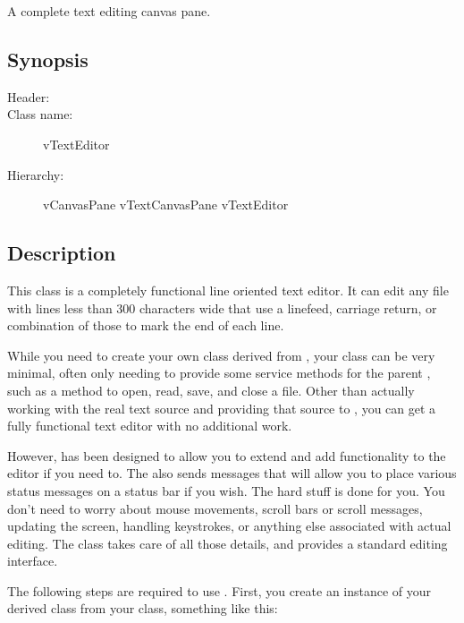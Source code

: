 

A complete text editing canvas pane.

\subsection* {Synopsis}

\begin{description}
	\item [Header:] 
	\item [Class name:] vTextEditor
 	\item [Hierarchy:] vCanvasPane \rta vTextCanvasPane \rta vTextEditor
\end{description}

\subsection* {Description}

This class is a completely functional line oriented text editor.
It can edit any file with lines less than 300 characters wide that
use a linefeed, carriage return, or combination of those to mark
the end of each line.

While you need to create your own class derived from ,
your class can be very minimal, often only needing to provide some
service methods for the parent , such as a method
to open, read, save, and close a file. Other than actually working
with the real text source and providing that source to ,
you can get a fully functional text editor with no additional work.

However,  has been designed to allow you to extend
and add functionality to the editor if you need to. The 
also sends messages that will allow you to place various status
messages on a status bar if you wish. The hard stuff is done for you.
You don't need to worry about mouse movements, scroll bars or scroll
messages, updating the screen, handling keystrokes, or anything else
associated with actual editing. The  class takes
care of all those details, and provides a standard editing interface.

The following steps are required to use . First,
you create an instance of your derived class from your 
class, something like this:

